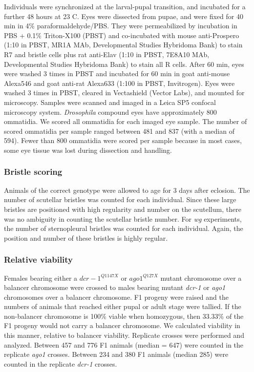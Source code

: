 Individuals were synchronized at the larval-pupal transition, and incubated for a further 48 hours at 23 \textdegree{}C. Eyes were dissected from pupae, and were fixed for 40 min in 4\% paraformaldehyde/PBS. They were permeabilized by incubation in PBS + 0.1\% Triton-X100 (PBST) and co-incubated with mouse anti-Prospero (1:10 in PBST, MR1A MAb, Developmental Studies Hybridoma Bank) to stain R7 and bristle cells plus rat anti-Elav (1:10 in PBST, 7E8A10 MAb, Developmental Studies Hybridoma Bank) to stain all R cells. After 60 min, eyes were washed 3 times in PBST and incubated for 60 min in goat anti-mouse Alexa546 and goat anti-rat Alexa633 (1:100 in PBST, Invitrogen). Eyes were washed 3 times in PBST, cleared in Vectashield (Vector Labs), and mounted for microscopy. Samples were scanned and imaged in a Leica SP5 confocal microscopy system. \textit{Drosophila} compound eyes have approximately 800 ommatidia. We scored all ommatidia for each imaged eye sample. The number of scored ommatidia per sample ranged between 481 and 837 (with a median of 594). Fewer than 800 ommatidia were scored per sample because in most cases, some eye tissue was lost during dissection and handling.

\subsubsection{Bristle scoring}

Animals of the correct genotype were allowed to age for 3 days after eclosion. The number of scutellar bristles was counted for each individual. Since these large bristles are positioned with high regularity and number on the scutellum, there was no ambiguity in counting the scutellar bristle number. For \textit{wg} experiments, the number of sternopleural bristles was counted for each individual. Again, the position and number of these bristles is highly regular.

\subsubsection{Relative viability}

Females bearing either a $dcr-1^{Q1147X}$ or $ago1^{Q127X}$ mutant chromosome over a balancer chromosome were crossed to males bearing mutant \textit{dcr-1} or \textit{ago1} chromosomes over a balancer chromosome. F1 progeny were raised and the numbers of animals that reached either pupal or adult stage were tallied. If the non-balancer chromosome is 100\% viable when homozygous, then 33.33\% of the F1 progeny would not carry a balancer chromosome. We calculated viability in this manner, relative to balancer viability. Replicate crosses were performed and analyzed. Between 457 and 776 F1 animals (median = 647) were counted in the replicate \textit{ago1} crosses. Between 234 and 380 F1 animals (median 285) were counted in the replicate \textit{dcr-1} crosses.

